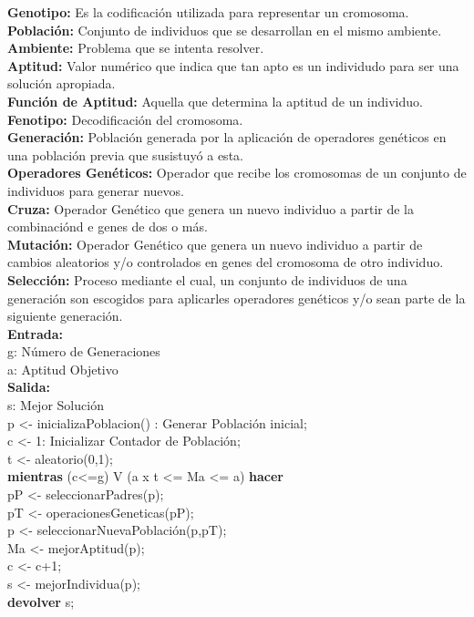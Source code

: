 		\textbf{Genotipo:} Es la codificación utilizada para representar un cromosoma.\\

		\textbf{Población:} Conjunto de individuos que se desarrollan en el mismo ambiente.\\

		\textbf{Ambiente:} Problema que se intenta resolver.\\

		\textbf{Aptitud:} Valor numérico que indica que tan apto es un individudo para ser una solución apropiada.\\

		\textbf{Función de Aptitud:} Aquella que determina la aptitud de un individuo.\\

		\textbf{Fenotipo:} Decodificación del cromosoma.\\

		\textbf{Generación:} Población generada por la aplicación de operadores genéticos en una población previa que susistuyó a esta.\\

		\textbf{Operadores Genéticos:} Operador que recibe los cromosomas de un conjunto de individuos para generar nuevos.\\

		\textbf{Cruza:} Operador Genético que genera un nuevo individuo a partir de la combinaciónd e genes de dos o más.\\

		\textbf{Mutación:} Operador Genético que genera un nuevo individuo a partir de cambios aleatorios y/o controlados en genes del cromosoma de otro individuo.\\

		\textbf{Selección:} Proceso mediante el cual, un conjunto de individuos de una generación son escogidos para aplicarles operadores genéticos y/o sean parte de la siguiente generación. \\
		
		\textbf{Entrada:}\\
		g: Número de Generaciones\\
		a: Aptitud Objetivo\\
		\textbf{Salida:}\\
		s: Mejor Solución\\

		p <- inicializaPoblacion() : Generar Población inicial;\\
		c <- 1: Inicializar Contador de Población;\\
		t <- aleatorio(0,1);\\
		\textbf{mientras} (c<=g) V (a x t <= Ma <= a) \textbf{hacer}\\
			pP <- seleccionarPadres(p);\\
			pT <- operacionesGeneticas(pP);\\
			p <- seleccionarNuevaPoblación(p,pT);\\
			Ma <- mejorAptitud(p);\\
			c <- c+1;\\
		s <- mejorIndividua(p);\\
		\textbf{devolver} s;\\	

